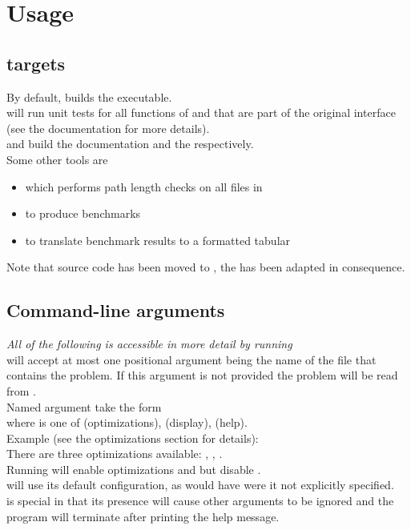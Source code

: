 \section{Usage}\label{sec-usage}

\subsection{ targets}

By default,  builds the  executable.\\
 will run unit tests for all functions of
 and  that are part of the original
interface (see the documentation for more details).\\

 and  build the documentation and the
 respectively.\\

Some other tools are
\begin{itemize}
    \item {} which performs path length checks on all files in 
    \item {} to produce benchmarks
    \item {} to translate benchmark results to a formatted tabular
\end{itemize}

Note that source code has been moved to , the  has
been adapted in consequence.

\subsection{Command-line arguments}

\textit{All of the following is accessible in more detail by running
}\\

 will accept at most one positional argument being the name of the
file that contains the problem. If this argument is not provided the problem will
be read from .\\

Named argument take the form \ttt{-[CATEGORY][FLAGS]}\\
where  is one of  (optimizations),  (display),
 (help).\\

Example (see the optimizations section for details):\\
There are three optimizations available: , , .\\
Running  will enable optimizations  and 
but disable .\\
 will use its default configuration, as would have  were it not
explicitly specified.\\

 is special in that its presence will cause other arguments to be ignored
and the program will terminate after printing the help message.\\


